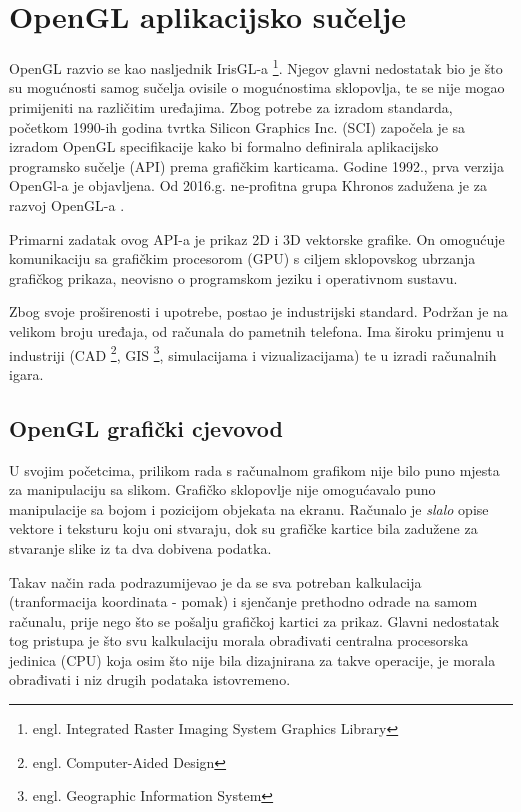 \section{OpenGL aplikacijsko sučelje}

OpenGL razvio se kao nasljednik IrisGL-a \footnote{engl. Integrated Raster Imaging System Graphics Library}. Njegov glavni nedostatak bio je što su mogućnosti samog sučelja ovisile o mogućnostima sklopovlja, te se nije mogao primijeniti na različitim uređajima. Zbog potrebe za izradom standarda, početkom 1990-ih godina tvrtka Silicon Graphics Inc. (SCI) započela je sa izradom OpenGL specifikacije kako bi formalno definirala aplikacijsko programsko sučelje (API) prema grafičkim karticama. Godine 1992., prva verzija OpenGl-a je objavljena. Od 2016.g. ne-profitna grupa Khronos zadužena je za razvoj OpenGL-a \cite{opengl-wiki-hostory}.

Primarni zadatak ovog API-a je prikaz 2D i 3D vektorske grafike. On omogućuje komunikaciju sa grafičkim procesorom (GPU) s ciljem sklopovskog ubrzanja grafičkog prikaza, neovisno o programskom jeziku i operativnom sustavu.

Zbog svoje proširenosti i upotrebe, postao je industrijski standard. Podržan je na velikom broju uređaja, od računala do pametnih telefona. Ima široku primjenu u industriji (CAD \footnote{engl. Computer-Aided Design}, GIS \footnote{engl. Geographic Information System}, simulacijama i vizualizacijama) te u izradi računalnih igara.

\subsection{OpenGL grafički cjevovod}
\label{sec:opengl-pipeline}

U svojim početcima, prilikom rada s računalnom grafikom nije bilo puno mjesta za manipulaciju sa slikom. Grafičko sklopovlje nije omogućavalo puno manipulacije sa bojom i pozicijom objekata na ekranu. Računalo je \emph{slalo} opise vektore i teksturu koju oni stvaraju, dok su grafičke kartice bila zadužene za stvaranje slike iz ta dva dobivena podatka.

Takav način rada podrazumijevao je da se sva potreban kalkulacija (tranformacija koordinata - pomak) i sjenčanje prethodno odrade na samom računalu, prije nego što se pošalju grafičkoj kartici za prikaz. Glavni nedostatak tog pristupa je što svu kalkulaciju morala obrađivati centralna procesorska jedinica (CPU) koja osim što nije bila dizajnirana za takve operacije, je morala obrađivati i niz drugih podataka istovremeno.

